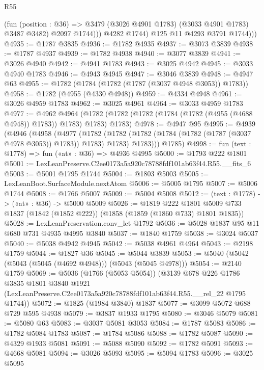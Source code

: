 \begin{lexlean}{R55}
\begin{coremodule}
                  (fun (position : @36) =>
                  @3479 (@3026 @4901 @1783) (@3033 @4901 @1783) @3487 @3482)
                  @2097
                  @1744)))
            @4282
            @1744)
          @125
          @11
          @4293
          @3791
          @1744)))
@4935 := @1787 @3835
@4936 := @1782 @4935
@4937 := @3073 @3839
@4938 := @1787 @4937
@4939 := @1782 @4938
@4940 := @3077 @3839
@4941 := @3026 @4940
@4942 := @4941 @1783
@4943 := @3025 @4942
@4945 := @3033 @4940 @1783
@4946 := @4943 @4945
@4947 := @3046 @3839
@4948 := @4947 @63
@4955 := @1782 (@1784 (@1782 (@1787 (@3037 @4948 @3053)) @1783))
@4958 := @1782 (@4955 (@4330 @4948))
@4959 := @4334 @4948
@4961 := @3026 @4959 @1783
@4962 := @3025 @4961
@4964 := @3033 @4959 @1783
@4977 := @4962
    @4964
    (@1782 (@1782 (@1782 (@1784 (@1782 (@4955 (@4688 @4948)) @1783)) @1783) @1783) @1783)
@4978 := @4947 @95
@4995 := @4939
    (@4946
      (@4958
        (@4977
          (@1782
            (@1782 (@1782 (@1784 (@1782 (@1787 (@3037 @4978 @3053)) @1783)) @1783) @1783)
            @1783)))
      @1785)
@4998 := fun (text : @1778) => fun («at» : @36) => @4936 @4995
@5000 := @1793 @222 @1801
@5001 := LexLeanPreserve.C2ee0173a5a920c78788fdf101ab63f44.R55.__fits_6
@5003 := @5001 @1795 @1744
@5004 := @1803 @5003
@5005 := LexLeanBoot.SurfaceModule.nextAtom
@5006 := @5005 @1795
@5007 := @5006 @1744
@5008 := @1766 @5007
@5009 := @5004 @5008
@5012 := (text : @1778) -> («at» : @36) -> @5000 @5009
@5026 := @1819
    @222
    @1801
    @5009
    @733
    @1837
    (@1842 (@1852 @222))
    (@1858 (@1859 (@1860 @733) @1801 @1835))
@5028 := LexLeanPreservation.conv_let @1792
@5036 := @5028 @1837 @95 @11 @680 @731 @4935 @4995 @3840
@5037 := @1840 @1759
@5038 := @3024 @5037
@5040 := @5038 @4942 @4945
@5042 := @5038 @4961 @4964
@5043 := @2198 @1759
@5044 := @1827 @36
@5045 := @5044 @3839
@5053 := @5040 (@5042 (@5043 (@5045 (@4692 @4948))) (@5043 (@5045 @4978)))
@5054 := @2140 @1759
@5069 := @5036
    (@1766 (@5053 @5054))
    (@3139
      @678
      @226
      @1786
      @3835
      @1801
      @3840
      @1921
      (LexLeanPreserve.C2ee0173a5a920c78788fdf101ab63f44.R55.__rel_22 @1795 @1744))
@5072 := @1825 (@1984 @3840) @1837
@5077 := @3099 @5072 @688 @729 @595 @4938
@5079 := @3837 @1933 @1795
@5080 := @3046 @5079
@5081 := @5080 @63
@5083 := @3037 @5081 @3053
@5084 := @1787 @5083
@5086 := @1782 @5084 @1783
@5087 := @1784 @5086
@5088 := @1782 @5087
@5090 := @4329 @1933 @5081
@5091 := @5088 @5090
@5092 := @1782 @5091
@5093 := @4668 @5081
@5094 := @3026 @5093
@5095 := @5094 @1783
@5096 := @3025 @5095

\end{coremodule}
\end{lexlean}
